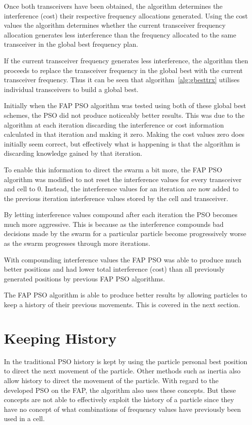 Once both transceivers have been obtained, the algorithm determines the interference (cost) their respective frequency allocations generated. Using the cost values the algorithm determines whether the current transceiver frequency allocation generates less interference than the frequency allocated to the same transceiver in the global best frequency plan.

If the current transceiver frequency generates less interference, the algorithm then proceeds to replace the transceiver frequency in the global best with the current transceiver frequency. Thus it can be seen that algorithm~\ref{alg:gbesttrx} utilises individual transceivers to build a global best.

Initially when the FAP PSO algorithm was tested using both of these global best schemes, the PSO did not produce noticeably better results. This was due to the algorithm at each iteration discarding the interference or cost information calculated in that iteration and making it zero. Making the cost values zero does initially seem correct, but effectively what is happening is that the algorithm is discarding knowledge gained by that iteration.

To enable this information to direct the swarm a bit more, the FAP PSO algorithm was modified to not reset the interference values for every transceiver and cell to 0. Instead, the interference values for an iteration are now added to the previous iteration interference values stored by the cell and transceiver. 

By letting interference values compound after each iteration the PSO becomes much more aggressive. This is because as the interference compounds bad decisions made by the swarm for a particular particle become progressively worse as the swarm progresses through more iterations.

With compounding interference values the FAP PSO was able to produce much better positions and had lower total interference (cost) than all previously generated positions by previous FAP PSO algorithms. 

The FAP PSO algorithm is able to produce better results by allowing particles to keep a history of their previous movements. This is covered in the next section.
\section{Keeping History}
\label{sec:keepinghistory}
In the traditional PSO history is kept by using the particle personal best position to direct the next movement of the particle. Other methods such as inertia also allow history to direct the movement of the particle. With regard to the developed PSO on the FAP, the algorithm also uses these concepts. But these concepts are not able to effectively exploit the history of a particle since they have no concept of what combinations of frequency values have previously been used in a cell.

